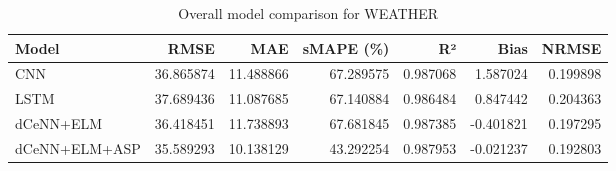 \begin{table}
\caption{Overall model comparison for WEATHER}
\begin{tabular}{lrrrrrr}
\toprule
Model & RMSE & MAE & sMAPE (\%) & R² & Bias & NRMSE \\
\midrule
CNN & 36.865874 & 11.488866 & 67.289575 & 0.987068 & 1.587024 & 0.199898 \\
LSTM & 37.689436 & 11.087685 & 67.140884 & 0.986484 & 0.847442 & 0.204363 \\
dCeNN+ELM & 36.418451 & 11.738893 & 67.681845 & 0.987385 & -0.401821 & 0.197295 \\
dCeNN+ELM+ASP & 35.589293 & 10.138129 & 43.292254 & 0.987953 & -0.021237 & 0.192803 \\
\bottomrule
\end{tabular}
\end{table}
